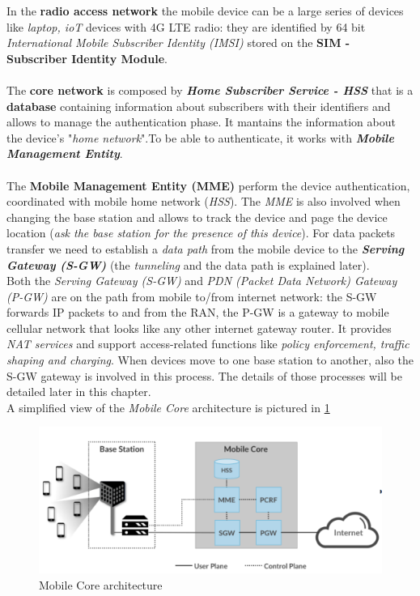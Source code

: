 \documentclass[10pt,a4paper]{report}
\theoremstyle{definition}
\begin{document}
In the \textbf{radio access network} the mobile device can be a large series of devices like \textit{laptop, ioT} devices with 4G LTE radio: they are identified by 64 bit \textit{International Mobile Subscriber Identity (IMSI)} stored on the \textbf{SIM - Subscriber Identity Module}.\\\\
The \textbf{core network} is composed by \textit{\textbf{Home Subscriber Service - HSS}} that is a \textbf{database} containing information about subscribers with their identifiers and allows to manage the authentication phase. It mantains the information about the device's "\textit{home network}".To be able to authenticate, it works with \textit{\textbf{Mobile Management Entity}}.\\\\
The \textbf{Mobile Management Entity (MME)} perform the device authentication, coordinated with mobile home network (\textit{HSS}). The \textit{MME} is also involved when changing the base station and allows to track the device and page the device location (\textit{ask the base station for the presence of this device}).
For data packets transfer we need to establish a \textit{data path} from the mobile device to the \textit{\textbf{Serving Gateway (S-GW)}} (the \textit{tunneling} and the data path is explained later).\\
Both the \textit{Serving Gateway (S-GW)} and \textit{PDN (Packet Data Network) Gateway (P-GW)} are on the path from mobile to/from internet network: the S-GW forwards IP packets to and from the RAN, the P-GW is a gateway to mobile cellular network that looks like any other internet gateway router. It provides \textit{NAT services} and support access-related functions like \textit{policy enforcement, traffic shaping and charging}.
When devices move to one base station to another, also the S-GW gateway is involved in this process. The details of those processes will be detailed later in this chapter.\\
A simplified view of the \textit{Mobile Core} architecture is pictured in \ref{mobile-core}

\begin{figure}[h]
	\centering
	\includegraphics[scale=0.60]{images/Pasted image 20230308164331.png}
	\caption{Mobile Core architecture}
	\label{mobile-core}
\end{figure}
\end{document}
